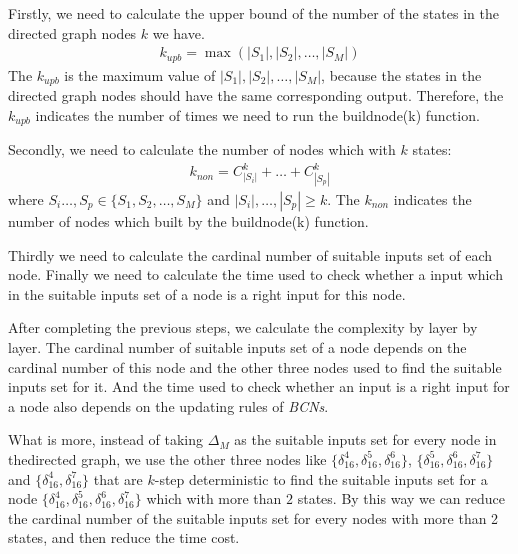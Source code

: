 Firstly, we need to calculate the upper bound of the number of the states in the directed graph nodes $k$ we have.
\begin{equation}
\begin{split}
k_{upb}= \max(|S_1|,|S_2|,\ldots,|S_M|)
\end{split}
\end{equation}
The $k_{upb}$ is the maximum value of $|S_1|,|S_2|,\ldots,|S_M|$, because the states in the directed graph nodes should have the same corresponding output. Therefore, the $k_{upb}$ indicates the number of times we need to run the {\sf buildnode}(k) function.

Secondly, we need to calculate the number of nodes which with $k$ states:
\begin{equation}
\begin{split}
k_{non}= C_{|S_i|}^k+\ldots +C_{|S_p|}^k
\end{split}
\end{equation}
where $S_i\ldots,S_p\in\{S_1, S_2,\ldots,S_M\}$ and $|S_i|,\ldots,|S_p|\ge k$. The $k_{non}$ indicates the number of nodes which built by the {\sf buildnode}(k) function.

Thirdly we need to calculate the cardinal number of suitable inputs set of each node. Finally we need to calculate the time used to check whether a input which in the suitable inputs set of a node is a right input for this node.

After completing the previous steps, we calculate the complexity by layer by layer. The cardinal number of suitable inputs set of a node depends on the cardinal number of this node and the other three nodes used to find the suitable inputs set for it. And the time used to check whether an input is a right input for a node also depends on the updating rules of {\em BCNs}.

What is more, instead of taking $\Delta_M$ as the suitable inputs set for every node in thedirected graph, we use the other three nodes like $\{\delta_{16}^4,\delta_{16}^5,\delta_{16}^6\}$, $\{\delta_{16}^5,\delta_{16}^6,\delta_{16}^7\}$ and $\{\delta_{16}^4,\delta_{16}^7\}$ that are $k$-step deterministic to find the suitable inputs set for a node $\{\delta_{16}^4,\delta_{16}^5,\delta_{16}^6,\delta_{16}^7\}$ which with more than $2$ states. By this way we can  reduce the cardinal number of the suitable inputs set for every nodes with more than 2 states, and then reduce the time cost. 


